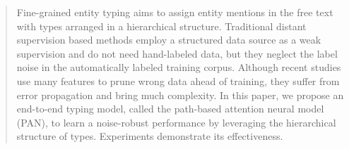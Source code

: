 \documentclass[letterpaper]{article} %
\begin{document}
\begin{abstract}
Fine-grained entity typing aims to assign entity mentions in the free text with types arranged in a hierarchical structure. 
Traditional distant supervision based methods employ a structured data source as a weak supervision and do not need hand-labeled data, but they neglect the label noise in the automatically labeled training corpus. 
Although recent studies use many features to prune wrong data ahead of training, they suffer from error propagation and bring much complexity. 
In this paper, we propose an end-to-end typing model, called the path-based attention neural model (PAN), to learn a noise-robust performance by leveraging the hierarchical structure of types. Experiments %
demonstrate its effectiveness. 
\end{abstract}
\end{document}
